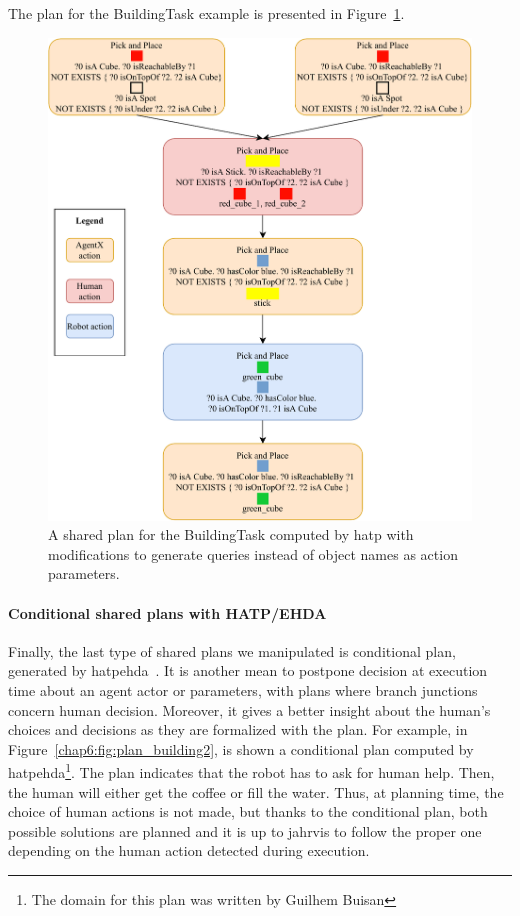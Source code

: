 \documentclass[a4paper,11pt,twoside]{StyleThese}
\begin{document}
The plan for the BuildingTask example is presented in Figure~\ref{chap6:fig:plan_hatp}.

\begin{figure}[!htb]
	\centering
	\includegraphics[width=\linewidth]{figures/chapter2/plan_hatp.pdf}
	\caption{A shared plan for the BuildingTask computed by \acrshort{hatp} with modifications to generate \sparql{} queries instead of object names as action parameters.}
	\label{chap6:fig:plan_hatp}
\end{figure}
\thispagestyle{example}
\paragraph{Conditional shared plans with HATP/EHDA}
Finally, the last type of shared plans we manipulated is conditional plan, generated by \acrfull{hatpehda}~\cite{buisan_2021_human}. It is another mean to postpone decision at execution time about an agent actor or parameters, with plans where branch junctions concern human decision. Moreover, it gives a better insight about the human's choices and decisions as they are formalized with the plan. For example, in Figure~\ref{chap6:fig:plan_building2}, is shown a conditional plan computed by \acrshort{hatpehda}\footnote{The domain for this plan was written by Guilhem Buisan}. The plan indicates that the robot has to ask for human help. Then, the human will either get the coffee or fill the water. Thus, at planning time, the choice of human actions is not made, but thanks to the conditional plan, both possible solutions are planned and it is up to \acrshort{jahrvis} to follow the proper one depending on the human action detected during execution.
\end{document}
